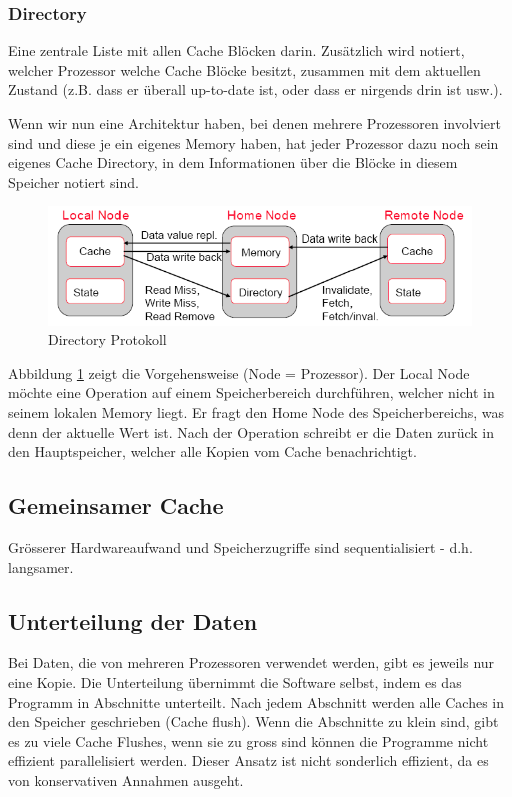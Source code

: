 \subsubsection{Directory}
Eine zentrale Liste mit allen Cache Blöcken darin. Zusätzlich wird notiert, welcher Prozessor welche Cache Blöcke besitzt, zusammen mit dem aktuellen Zustand (z.B. dass er überall up-to-date ist, oder dass er nirgends drin ist usw.).

Wenn wir nun eine Architektur haben, bei denen mehrere Prozessoren involviert sind und diese je ein eigenes Memory haben, hat jeder Prozessor dazu noch sein eigenes Cache Directory, in dem Informationen über die Blöcke in diesem Speicher notiert sind.

\begin{figure}[h!]
\centering
\includegraphics[width=0.7\linewidth]{fig/directory_protocol}
\caption{Directory Protokoll}
\label{fig:directory_protocol}
\end{figure}

Abbildung \ref{fig:directory_protocol} zeigt die Vorgehensweise (Node = Prozessor). Der Local Node möchte eine Operation auf einem Speicherbereich durchführen, welcher nicht in seinem lokalen Memory liegt. Er fragt den Home Node des Speicherbereichs, was denn der aktuelle Wert ist. Nach der Operation schreibt er die Daten zurück in den Hauptspeicher, welcher alle Kopien vom Cache benachrichtigt.

\subsection{Gemeinsamer Cache}
Grösserer Hardwareaufwand und Speicherzugriffe sind sequentialisiert -  d.h. langsamer.

\subsection{Unterteilung der Daten}
Bei Daten, die von mehreren Prozessoren verwendet werden, gibt es jeweils nur eine Kopie. Die Unterteilung übernimmt die Software selbst, indem es das Programm in Abschnitte unterteilt. Nach jedem Abschnitt werden alle Caches in den Speicher geschrieben (Cache flush). Wenn die Abschnitte zu klein sind, gibt es zu viele Cache Flushes, wenn sie zu gross sind können die Programme nicht effizient parallelisiert werden. Dieser Ansatz ist nicht sonderlich effizient, da es von konservativen Annahmen ausgeht.
 
